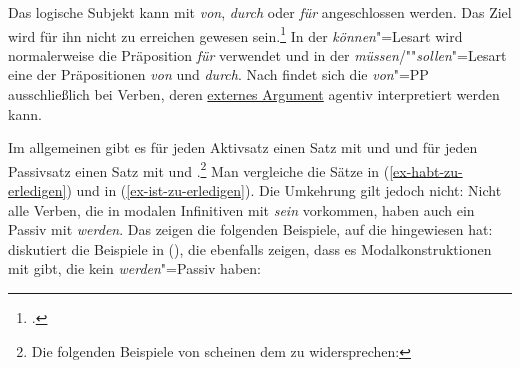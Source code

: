\zl
Das logische Subjekt kann mit \emph{von}, \emph{durch} oder \emph{für} angeschlossen werden.
\ea
Das Ziel wird für ihn nicht zu erreichen gewesen sein.\footnote{
         .
}
\z
In der \emph{können}"=Lesart wird normalerweise die Präposition \emph{für} verwendet und in der
\emph{müssen}/""\emph{sollen}"=Lesart eine der Präpositionen \emph{von} und \emph{durch}.
%
%
Nach \citet[]{Demske94a} findet sich die \emph{von}"=PP ausschließlich bei Verben,
deren \hyperlink{externesArgument}{externes Argument}
agentiv interpretiert werden kann.

Im allgemeinen gibt es für jeden Aktivsatz einen Satz mit \zuinf und \haben und für jeden
Passivsatz einen Satz mit \zuinf und \sein \citep*[]{Bierwisch63a}.\footnote{
Die folgenden Beispiele von \citet[]{Demske94a} scheinen dem zu widersprechen:
\eal
{}
\zllast
%
}
Man vergleiche die Sätze in (\ref{ex-habt-zu-erledigen}) und in (\ref{ex-ist-zu-erledigen}).
Die Umkehrung gilt jedoch nicht: Nicht alle Verben, die in modalen Infinitiven mit \emph{sein} vorkommen,
haben auch ein Passiv mit \emph{werden}. Das zeigen die folgenden
Beispiele, auf die \citet[]{Hoehle78a} hingewiesen hat:
\eal
{}
\zl
\citet[]{Haider86} diskutiert die Beispiele in (), die ebenfalls
zeigen, dass es Modalkonstruktionen mit \sein gibt, die kein \emph{werden}"=Passiv haben:
\eal
{}
\zl
